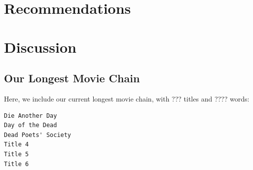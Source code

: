 \documentclass[11pt,english]{article}
\begin{document}
\section{Recommendations}

\section{Discussion}

\begin{appendices}
\section{Our Longest Movie Chain}
Here, we include our current longest movie chain, with ??? titles and ????
words:
\begin{multicols}{3}
\begin{verbatim}
Die Another Day
Day of the Dead
Dead Poets' Society
Title 4
Title 5
Title 6
\end{verbatim}
\end{multicols}
\end{appendices}
\end{document}
